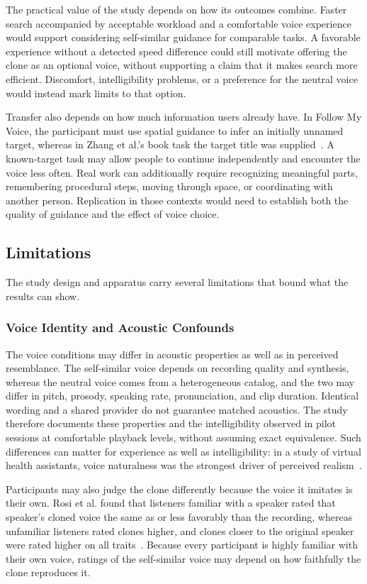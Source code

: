 The practical value of the study depends on how its outcomes combine. Faster search accompanied by acceptable workload and a comfortable voice experience would support considering self-similar guidance for comparable tasks. A favorable experience without a detected speed difference could still motivate offering the clone as an optional voice, without supporting a claim that it makes search more efficient. Discomfort, intelligibility problems, or a preference for the neutral voice would instead mark limits to that option.

Transfer also depends on how much information users already have. In Follow My Voice, the participant must use spatial guidance to infer an initially unnamed target, whereas in Zhang et al.'s book task the target title was supplied~\cite{zhang2023seehear}. A known-target task may allow people to continue independently and encounter the voice less often. Real work can additionally require recognizing meaningful parts, remembering procedural steps, moving through space, or coordinating with another person. Replication in those contexts would need to establish both the quality of guidance and the effect of voice choice.

\subsection{Limitations}
The study design and apparatus carry several limitations that bound what the results can show.

\subsubsection{Voice Identity and Acoustic Confounds}
The voice conditions may differ in acoustic properties as well as in perceived resemblance. The self-similar voice depends on recording quality and synthesis, whereas the neutral voice comes from a heterogeneous catalog, and the two may differ in pitch, prosody, speaking rate, pronunciation, and clip duration. Identical wording and a shared provider do not guarantee matched acoustics. The study therefore documents these properties and the intelligibility observed in pilot sessions at comfortable playback levels, without assuming exact equivalence. Such differences can matter for experience as well as intelligibility: in a study of virtual health assistants, voice naturalness was the strongest driver of perceived realism~\cite{maxim2025realism}.

Participants may also judge the clone differently because the voice it imitates is their own. Rosi et al. found that listeners familiar with a speaker rated that speaker's cloned voice the same as or less favorably than the recording, whereas unfamiliar listeners rated clones higher, and clones closer to the original speaker were rated higher on all traits~\cite{mcgettigan2025cloned}. Because every participant is highly familiar with their own voice, ratings of the self-similar voice may depend on how faithfully the clone reproduces it.

